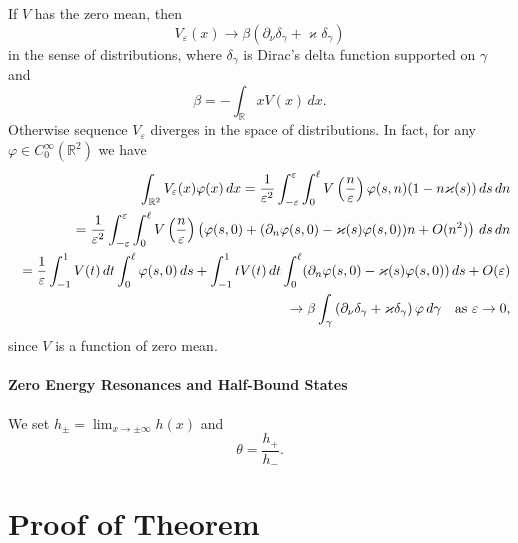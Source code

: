 \documentclass[graybox]{svmult}
\renewcommand{\kappa}{\varkappa}
\newcommand{\Real}{\mathbb R}
\newcommand{\eps}{\varepsilon}
\renewcommand{\phi}{\varphi}
\begin{document}
If $V$ has the zero mean, then
$$
   V_\eps(x)\to \beta\left(\partial_\nu\delta_\gamma+\kappa \delta_\gamma\right)
$$
in the sense of distributions, where $\delta_\gamma$ is Dirac's delta function supported on $\gamma$ and
$$
  \beta=-\int_\Real xV(x)\,dx.
$$
Otherwise sequence $V_\eps$ diverges in the space of distributions.
In fact, for any $\phi\in C^\infty_0(\Real^2)$ we have
\begin{eqnarray}\nonumber
&&\int_{\Real^2}V_\eps(x)\phi(x)\,dx=
\frac{1}{\eps^2}\int_{-\eps}^{\eps}\int_0^\ell V\left(\frac{n}{\eps}\right)\phi(s,n)(1-n\kappa(s))\,ds\,dn\\\nonumber
&&=\frac{1}{\eps^2}\int_{-\eps}^{\eps}\int_0^\ell V\left(\frac{n}{\eps}\right)\left(\phi(s,0)+(\partial_n\phi(s,0)-\kappa(s)\phi(s,0))n+O(n^2)\right)\,ds\,dn
\\\nonumber
&& =\frac{1}{\eps}\int_{-1}^1 V(t)\,dt \int_0^\ell\phi(s,0)\,ds+
\int_{-1}^1 t V(t)\,dt \int_0^\ell(\partial_n\phi(s,0)-\kappa(s)\phi(s,0))\,ds+O(\eps)
\\\nonumber
&&\qquad\qquad\qquad\qquad\to \beta\int_\gamma\left(\partial_\nu\delta_\gamma+\kappa \delta_\gamma\right)\phi\,d\gamma\quad \hbox{as }\eps\to 0,
\end{eqnarray}
since $V$ is a function of zero mean.

\paragraph{ Zero Energy Resonances and Half-Bound States}
We set  $h_\pm=\lim_{x\to\pm\infty}h(x)$ and
\begin{equation}\label{Theta}
  \theta= \frac{h_+}{h_-}.
\end{equation}

\section{Proof of Theorem}
\label{Sec:Proof}
\end{document}
